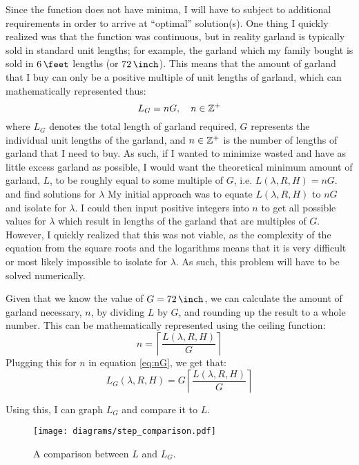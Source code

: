 Since the function does not have minima, I will have to subject to additional requirements in order to arrive at ``optimal'' solution(s). One thing I quickly realized was that the function was continuous, but in reality garland is typically sold in standard unit lengths; for example, the garland which my family bought is sold in $\US{6}{\feet}$ lengths (or $\US{72}{\inch}$). This means that the amount of garland that I buy can only be a positive multiple of unit lengths of garland, which can mathematically represented thus:
\begin{equation}
    L_G = nG,\quad n \in \mathbb{Z}^+ \label{eq:nG}
\end{equation}
where $L_G$ denotes the total length of garland required, $G$ represents the individual unit lengths of the garland, and $n\in \mathbb{Z}^+$ is the number of lengths of garland that I need to buy. As such, if I wanted to minimize wasted and have as little excess garland as possible, I would want the theoretical minimum amount of garland, $L$, to be roughly equal to some multiple of $G$, i.e. $L(\lambda, R, H) = nG$.
and find solutions for $\lambda$
My initial approach was to equate $L(\lambda, R, H)$ to $nG$ and isolate for $\lambda$. I could then input positive integers into $n$ to get all possible values for $\lambda$ which result in lengths of the garland that are multiples of $G$. However, I quickly realized that this was not viable, as the complexity of the equation from the square roots and the logarithms means that it is very difficult or most likely impossible to isolate for $\lambda$. As such, this problem will have to be solved numerically.




Given that we know the value of $G=\US{72}{\inch}$, we can calculate the amount of garland necessary, $n$, by dividing $L$ by $G$, and rounding up the result to a whole number. This can be mathematically represented using the ceiling function:
\begin{equation}
    n = \left\lceil \frac{L(\lambda, R, H)}{G} \right\rceil
\end{equation}
Plugging this for $n$ in equation \ref{eq:nG}, we get that:
\begin{equation}
    L_G(\lambda, R, H) = G\left\lceil \frac{L(\lambda, R, H)}{G} \right\rceil
\end{equation}

Using this, I can graph $L_G$ and compare it to $L$.
\begin{figure}[H]
    \centering
    \texttt{[image: diagrams/step\_comparison.pdf]}
    \caption{A comparison between $L$ and $L_G$.}
\end{figure}



